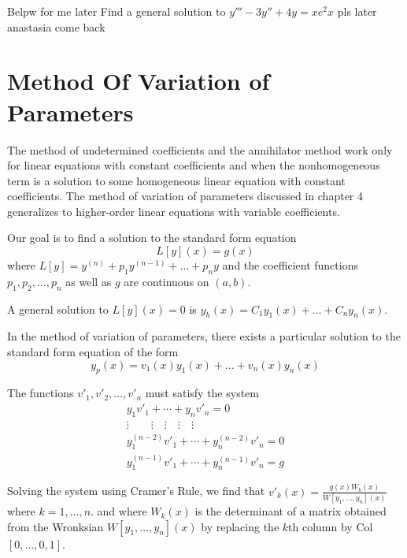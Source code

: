 \documentclass[../diffeq.tex]{subfiles}
\begin{document}
Belpw for me later 
\ex Find a general solution to $y'''-3y''+4y=xe^2x$ pls later anastasia come back 

\section{Method Of Variation of Parameters}
The method of undetermined coefficients and the annihilator method work only for linear equations with constant coefficients and when the nonhomogeneous term is a solution to some homogeneous linear equation with constant coefficients.
The method of variation of parameters discussed in chapter 4 generalizes to higher-order linear equations with variable coefficients.

Our goal is to find a solution to the standard form equation 
\[ L[y](x) = g(x) \]
where $L[y]=y^{(n)}+p_1y^{(n-1)}+\dots + p_n y$ and the coefficient functions $p_1,p_2,\dots,p_n$ as well as $g$ are continuous on $(a,b)$.

A general solution to $L[y](x)=0$ is $y_h(x)=C_1y_1(x)+\dots+C_ny_n(x)$.

In the method of variation of parameters, there exists a particular solution to the standard form equation of the form 
\[ y_p(x)=v_1(x)y_1(x)+\dots + v_n(x)y_n(x) \]

The functions $v'_1,v'_2,\dots,v'_n$ must satisfy the system 
\begin{align*}
y_1v'_1+ \cdots + y_nv'_n =0 \\
\vdots \qquad \vdots \quad \vdots \quad \vdots \quad \vdots \\
y_1^{(n-2)}v'_1+\cdots +y^{(n-2)}_nv'_n=0\\
y_1^{(n-1)}v'_1+\cdots + y_n^{(n-1)}v'_n=g 
\end{align*}

Solving the system using Cramer's Rule, we find that $v'_k(x)=\frac{g(x)W_k(x)}{W[y_1,\dots,y_n](x)}$ where $k=1,\dots,n$. and where 
$W_k(x)$ is the determinant of a matrix obtained from the Wronksian $W[y_1,\dots,y_n](x)$ by replacing the $k$th column by Col$[0,\dots,0,1]$.
\end{document}
